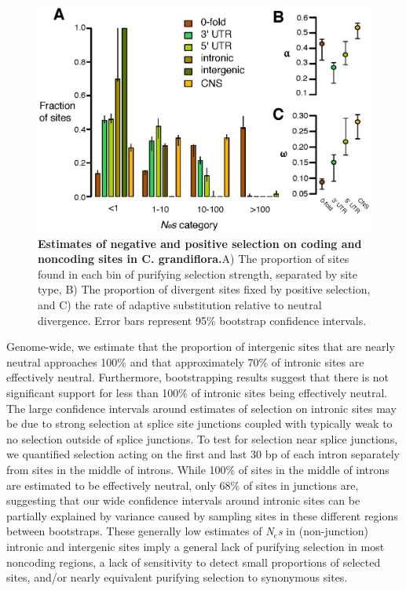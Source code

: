 \begin{figure}[ht!]
      \centering
       \includegraphics[scale=0.8]{Ch2Fig1}
    \caption{\textbf{Estimates of negative and positive selection on coding and noncoding sites in C. grandiflora.}A) The proportion of sites found in each bin of purifying selection strength, separated by site type, B) The proportion of divergent sites fixed by positive selection, and C) the rate of adaptive substitution relative to neutral divergence. Error bars represent 95\% bootstrap confidence intervals.}
    \label{fig:fig1}
\end{figure}

Genome-wide, we estimate that the proportion of intergenic sites that are nearly neutral approaches 100\% and that approximately 70\% of intronic sites are effectively neutral. Furthermore, bootstrapping results suggest that there is not significant support for less than 100\% of intronic sites being effectively neutral. The large confidence intervals around estimates of selection on intronic sites may be due to strong selection at splice site junctions \citep{Haudry2013-qe} coupled with typically weak to no selection outside of splice junctions. To test for selection near splice junctions, we quantified selection acting on the first and last 30 bp of each intron separately from sites in the middle of introns. While 100\% of sites in the middle of introns are estimated to be effectively neutral, only 68\% of sites in junctions are, suggesting that our wide confidence intervals around intronic sites can be partially explained by variance caused by sampling sites in these different regions between bootstraps. These generally low estimates of \textit{N$_{e}$s} in (non-junction) intronic and intergenic sites imply a general lack of purifying selection in most noncoding regions, a lack of sensitivity to detect small proportions of selected sites, and/or nearly equivalent purifying selection to synonymous sites. 

